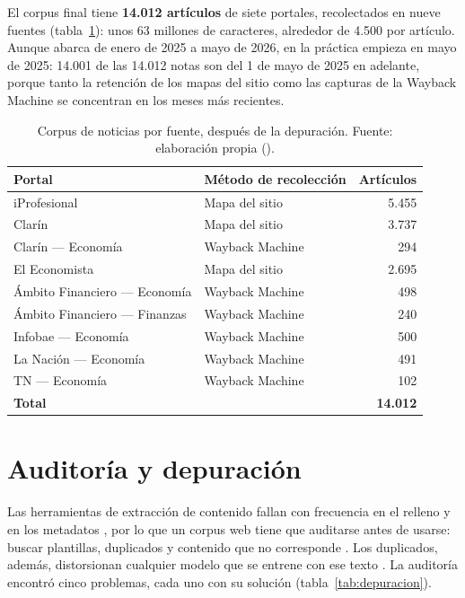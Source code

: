 El corpus final tiene \textbf{14.012 artículos} de siete portales, recolectados en nueve
fuentes (tabla~\ref{tab:corpus}): unos 63 millones de caracteres, alrededor de 4.500 por
artículo. Aunque abarca de enero de 2025 a mayo de 2026, en la práctica empieza en mayo de
2025: 14.001 de las 14.012 notas son del 1 de mayo de 2025 en adelante, porque tanto la
retención de los mapas del sitio como las capturas de la Wayback Machine se concentran en los
meses más recientes.

\begin{table}[H]
\centering\small
\begin{tabular}{@{}llr@{}}
\toprule
\textbf{Portal} & \textbf{Método de recolección} & \textbf{Artículos} \\
\midrule
iProfesional & Mapa del sitio & 5.455 \\
Clarín & Mapa del sitio & 3.737 \\
Clarín — Economía & Wayback Machine & 294 \\
El Economista & Mapa del sitio & 2.695 \\
Ámbito Financiero — Economía & Wayback Machine & 498 \\
Ámbito Financiero — Finanzas & Wayback Machine & 240 \\
Infobae — Economía & Wayback Machine & 500 \\
La Nación — Economía & Wayback Machine & 491 \\
TN — Economía & Wayback Machine & 102 \\
\midrule
\textbf{Total} & & \textbf{14.012} \\
\bottomrule
\end{tabular}
\caption{Corpus de noticias por fuente, después de la depuración. Fuente: elaboración propia
().}
\label{tab:corpus}
\end{table}

\section{Auditoría y depuración}

Las herramientas de extracción de contenido fallan con frecuencia en el relleno y en los
metadatos \citep{foley2026wcxb}, por lo que un corpus web tiene que auditarse antes de usarse:
buscar plantillas, duplicados y contenido que no corresponde \citep{dodge2021c4}. Los
duplicados, además, distorsionan cualquier modelo que se entrene con ese texto
\citep{lee2021dedup}. La auditoría encontró cinco problemas, cada uno con su solución
(tabla~\ref{tab:depuracion}).

